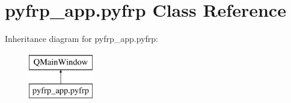 \hypertarget{classpyfrp__app_1_1pyfrp}{\section{pyfrp\+\_\+app.\+pyfrp Class Reference}
\label{classpyfrp__app_1_1pyfrp}
}
Inheritance diagram for pyfrp\+\_\+app.\+pyfrp\+:\begin{figure}[H]
\begin{center}
\leavevmode
\includegraphics[height=2.000000cm]{classpyfrp__app_1_1pyfrp}
\end{center}
\end{figure}
